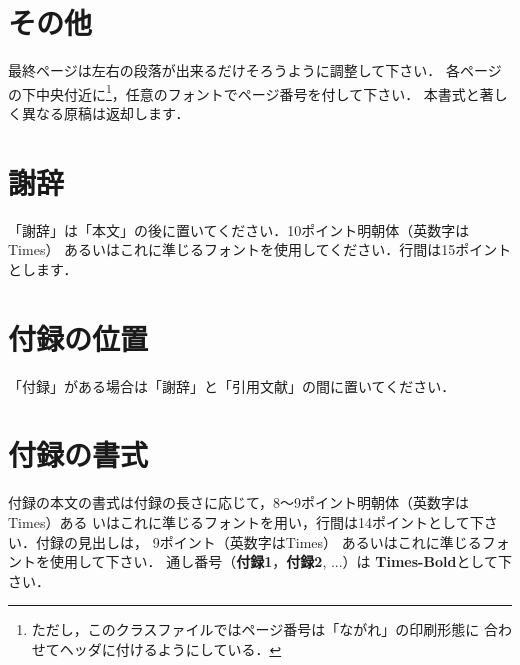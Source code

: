 \documentclass[main]{subfiles}
\begin{document}
    
        \section{その他}
    
        最終ページは左右の段落が出来るだけそろうように調整して下さい．
        各ページの下中央付近に\footnote{%
          ただし，このクラスファイルではページ番号は「ながれ」の印刷形態に
          合わせてヘッダに付けるようにしている．
        }，任意のフォントでページ番号を付して下さい．
        本書式と著しく異なる原稿は返却します．
    
    
        \section*{謝辞}
    
        「謝辞」は「本文」の後に置いてください．10ポイント明朝体（英数字はTimes）
        あるいはこれに準じるフォントを使用してください．行間は15ポイントとします．
    
        \appendix %
        \small %
    
        \section{付録の位置}
    
        「付録」がある場合は「謝辞」と「引用文献」の間に置いてください．
    
        \section{付録の書式}
    
        付録の本文の書式は付録の長さに応じて，8〜9ポイント明朝体（英数字はTimes）ある
        いはこれに準じるフォントを用い，行間は14ポイントとして下さい．付録の見出しは，
        9ポイント（英数字はTimes）
        あるいはこれに準じるフォントを使用して下さい．
        通し番号（\textbf{付録1}，\textbf{付録2}, ...）は
        \textbf{Times-Bold}として下さい．
\end{document}
